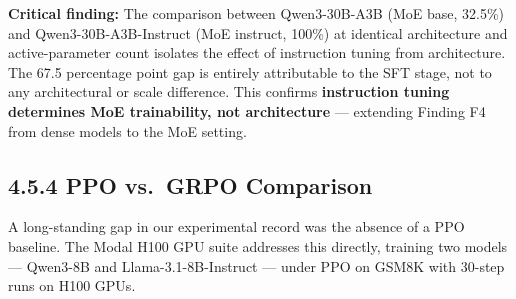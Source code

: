 \documentclass[
  american,
  11pt,
  a4paper,
  oneside]{report}
\begin{document}
\textbf{Critical finding:} The comparison between Qwen3-30B-A3B (MoE
base, 32.5\%) and Qwen3-30B-A3B-Instruct (MoE instruct, 100\%) at
identical architecture and active-parameter count isolates the effect of
instruction tuning from architecture. The 67.5 percentage point gap is
entirely attributable to the SFT stage, not to any architectural or
scale difference. This confirms \textbf{instruction tuning determines
MoE trainability, not architecture} --- extending Finding F4 from dense
models to the MoE setting.

\subsection{4.5.4 PPO vs.~GRPO
Comparison}\label{ppo-vs.-grpo-comparison}

A long-standing gap in our experimental record was the absence of a PPO
baseline. The Modal H100 GPU suite addresses this directly, training two
models --- Qwen3-8B and Llama-3.1-8B-Instruct --- under PPO on GSM8K
with 30-step runs on H100 GPUs.
\end{document}
